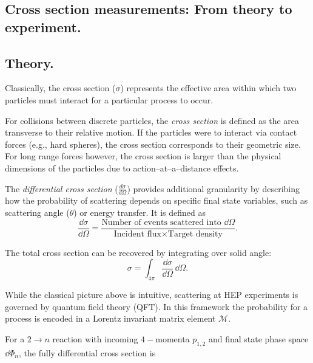\begin{definition}
\section{Cross section measurements: From theory to experiment.}
\subsection{Theory.}
    Classically, the cross section (\(\sigma\)) represents the effective area within which two particles must interact for a particular process to occur.
    \begin{definition}
        For collisions between discrete particles, the \emph{cross section} is defined as the area transverse to their relative motion.
        If the particles were to interact via contact forces (e.g., hard spheres), the cross section corresponds to their geometric size.
        For long range forces however, the cross section is larger than the physical dimensions of the particles due to action--at--a--distance effects.
    \end{definition}
%

    \begin{definition}
        The \emph{differential cross section} (\(\frac{d\sigma}{d\Omega}\)) provides additional granularity by describing how the probability of scattering depends on specific final state variables, such as scattering angle (\(\theta\)) or energy transfer.
        It is defined as
        \begin{equation}
            \frac{\dd\sigma}{\dd\Omega} = \frac{\text{Number of events scattered into } \dd\Omega}{\text{Incident flux} \times \text{Target density}}.
        \end{equation}
    \end{definition}

    The total cross section can be recovered by integrating over solid angle:
    \begin{equation}
    \sigma = \int_{4\pi} \frac{\dd\sigma}{\dd\Omega} \, \dd\Omega.
    \end{equation}

    While the classical picture above is intuitive, scattering at HEP experiments is governed by quantum field theory (QFT).
    In this framework the probability for a process is encoded in a Lorentz invariant matrix element \(\mathcal{M}\).
    
    For a \(2 \to n\) reaction with incoming \(4-\)momenta \(p_{1,2}\) and final state phase space \( \dd\Phi_n \), the fully differential cross section is


\end{definition}
